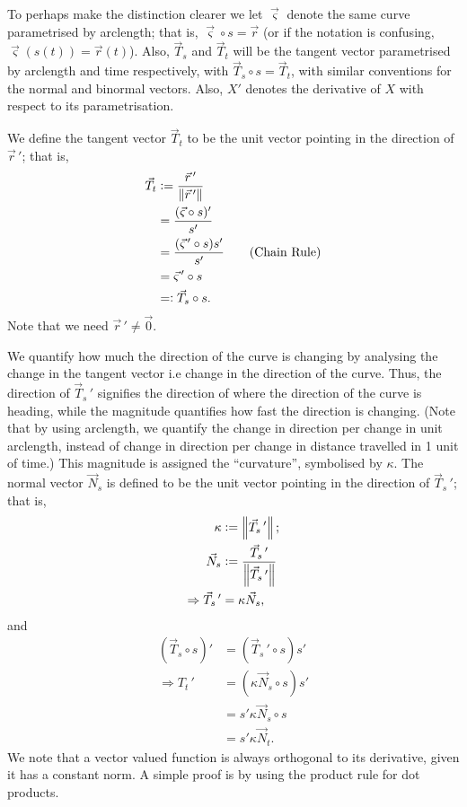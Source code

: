 \documentclass{article}
\newcommand{\vc}{\vcentcolon}
\theoremstyle{definition}
\begin{document}
To perhaps make the distinction clearer we let $\vec\varsigma$ denote the same curve parametrised by arclength; that is, $\vec\varsigma\circ s=\vec r$ (or if the notation is confusing, $\vec\varsigma(s(t))=\vec r(t)$). Also, $\vec T_s$ and $\vec T_t$ will be the tangent vector parametrised by arclength and time respectively, with $\vec T_s\circ s=\vec T_t$, with similar conventions for the normal and binormal vectors. Also, $X'$ denotes the derivative of $X$ with respect to its parametrisation.\par

We define the tangent vector $\vec T_t$ to be the unit vector pointing in the direction of $\vec r\,'$; that is,
\begin{align*}
	\vec T_t&\vc=\frac{\vec r\,'}{\left\lVert\vec r\,'\right\rVert}\\
	&=\frac{(\vec\varsigma\circ s)'}{s'}\\
	&=\frac{(\vec\varsigma\,'\circ s)s'}{s'}\tag*{(Chain Rule)}\\
	&=\vec\varsigma\,'\circ s\\
	&=\vc\vec T_s\circ s.
\end{align*}
Note that we need $\vec r\,'\not=\vec0$.

We quantify how much the direction of the curve is changing by analysing the change in the tangent vector i.e change in the direction of the curve. Thus, the direction of $\vec T_s\,'$ signifies the direction of where the direction of the curve is heading, while the magnitude quantifies how fast the direction is changing. (Note that by using arclength, we quantify the change in direction per change in unit arclength, instead of change in direction per change in distance travelled in 1 unit of time.) This magnitude is assigned the ``curvature'', symbolised by $\kappa$. The normal vector $\vec N_s$ is defined to be the unit vector pointing in the direction of $\vec T_s\,'$; that is,
\begin{align*}
	\kappa&\vc=\left\lVert\vec T_s\,'\right\rVert;\\
	\vec N_s&\vc=\frac{\vec T_s\,'}{\left\lVert\vec T_s\,'\right\rVert}\\
	\Rightarrow\vec T_s\,'&=\kappa \vec N_s,
\end{align*}
and
\begin{align*}
	(\vec T_s\circ s)'&=(\vec T_s\,'\circ s)s'\\
	\Rightarrow T_t\,'&=(\kappa \vec N_s\circ s)s'\\
	&=s'\kappa \vec N_s\circ s\\
	&=s'\kappa \vec N_t.
\end{align*}
We note that a vector valued function is always orthogonal to its derivative, given it has a constant norm. A simple proof is by using the product rule for dot products.\par
\end{document}
